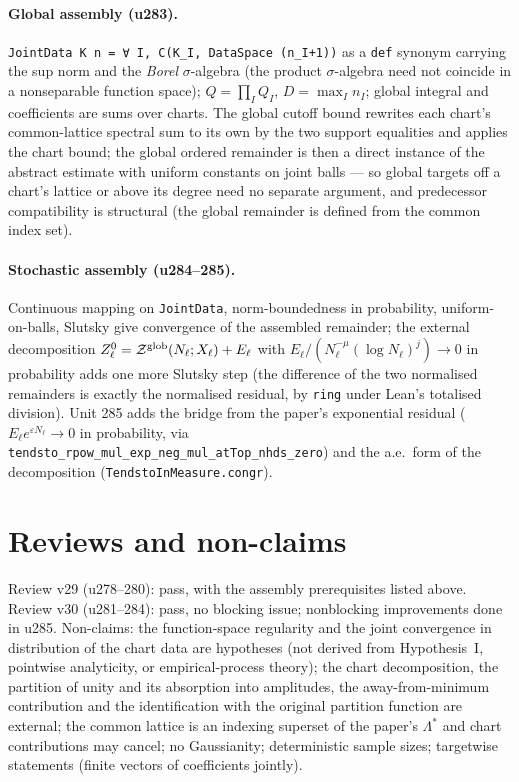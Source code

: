 \documentclass[11pt]{article}
\begin{document}
\paragraph{Global assembly (u283).} \texttt{JointData K n = ∀ I, C(K\_I, DataSpace (n\_I+1))} as a
\texttt{def} synonym carrying the sup norm and the \emph{Borel} $\sigma$-algebra (the product
$\sigma$-algebra need not coincide in a nonseparable function space); $Q=\prod_IQ_I$, $D=\max_In_I$;
global integral and coefficients are sums over charts. The global cutoff bound rewrites each chart's
common-lattice spectral sum to its own by the two support equalities and applies the chart bound;
the global ordered remainder is then a direct instance of the abstract estimate with uniform constants
on joint balls --- so global targets off a chart's lattice or above its degree need no separate
argument, and predecessor compatibility is structural (the global remainder is defined from the common
index set).
\paragraph{Stochastic assembly (u284--285).} Continuous mapping on \texttt{JointData}, norm-boundedness
in probability, uniform-on-balls, Slutsky give convergence of the assembled remainder; the external
decomposition $Z^0_\ell=\mathcal Z^{\rm glob}(N_\ell;X_\ell)+E_\ell$ with
$E_\ell/(N_\ell^{-\mu}(\log N_\ell)^j)\to0$ in probability adds one more Slutsky step (the difference of
the two normalised remainders is exactly the normalised residual, by \texttt{ring} under Lean's
totalised division). Unit 285 adds the bridge from the paper's exponential residual
($E_\ell e^{\varepsilon N_\ell}\to0$ in probability, via
\texttt{tendsto\_rpow\_mul\_exp\_neg\_mul\_atTop\_nhds\_zero}) and the a.e.\ form of the decomposition
(\texttt{TendstoInMeasure.congr}).

\section{Reviews and non-claims}
Review v29 (u278--280): pass, with the assembly prerequisites listed above. Review v30 (u281--284):
pass, no blocking issue; nonblocking improvements done in u285. Non-claims: the function-space
regularity and the joint convergence in distribution of the chart data are hypotheses (not derived
from Hypothesis~I, pointwise analyticity, or empirical-process theory); the chart decomposition, the
partition of unity and its absorption into amplitudes, the away-from-minimum contribution and the
identification with the original partition function are external; the common lattice is an indexing
superset of the paper's $\Lambda^*$ and chart contributions may cancel; no Gaussianity; deterministic
sample sizes; targetwise statements (finite vectors of coefficients jointly).
\end{document}
